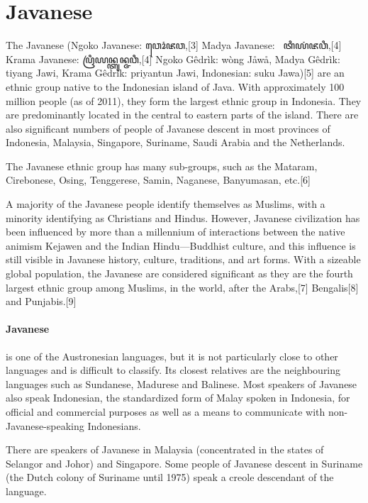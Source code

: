 \newfontfamily{}


\section{Javanese}
\label{s:javanese}


The Javanese (Ngoko Javanese: {\javanese ꦮꦺꦴꦁꦗꦮ},[3] Madya Javanese: {\javanese\   ꦠꦶꦪꦁꦗꦮꦶ},[4] Krama Javanese: ꦥꦿꦶꦪꦤ꧀ꦠꦸꦤ꧀ꦗꦮꦶ,[4] Ngoko Gêdrìk: wòng Jåwå, Madya Gêdrìk: tiyang Jawi, Krama Gêdrìk: priyantun Jawi, Indonesian: suku Jawa)[5] are an ethnic group native to the Indonesian island of Java. With approximately 100 million people (as of 2011), they form the largest ethnic group in Indonesia. They are predominantly located in the central to eastern parts of the island. There are also significant numbers of people of Javanese descent in most provinces of Indonesia, Malaysia, Singapore, Suriname, Saudi Arabia and the Netherlands.

The Javanese ethnic group has many sub-groups, such as the Mataram, Cirebonese, Osing, Tenggerese, Samin, Naganese, Banyumasan, etc.[6]

A majority of the Javanese people identify themselves as Muslims, with a minority identifying as Christians and Hindus. However, Javanese civilization has been influenced by more than a millennium of interactions between the native animism Kejawen and the Indian Hindu—Buddhist culture, and this influence is still visible in Javanese history, culture, traditions, and art forms. With a sizeable global population, the Javanese are considered significant as they are the fourth largest ethnic group among Muslims, in the world, after the Arabs,[7] Bengalis[8] and Punjabis.[9]


\paragraph{Javanese} is one of the Austronesian languages, but it is not particularly close to other languages and is difficult to classify. Its closest relatives are the neighbouring languages such as Sundanese, Madurese and Balinese. Most speakers of Javanese also speak Indonesian, the standardized form of Malay spoken in Indonesia, for official and commercial purposes as well as a means to communicate with non-Javanese-speaking Indonesians.

There are speakers of Javanese in Malaysia (concentrated in the states of Selangor and Johor) and Singapore. Some people of Javanese descent in Suriname (the Dutch colony of Suriname until 1975) speak a creole descendant of the language.

